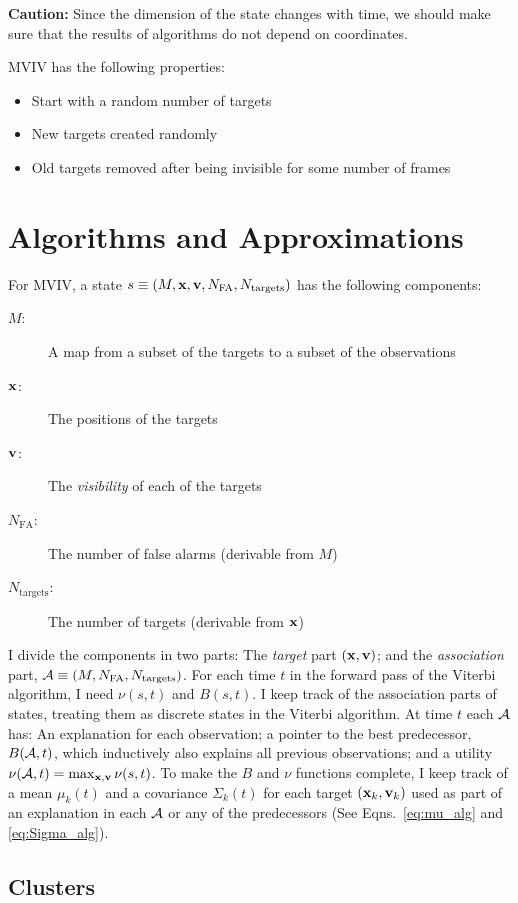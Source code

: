 \documentclass[11pt]{article}
\newcommand{\cA}{{\cal A}}
\begin{document}
\textbf{Caution:} Since the dimension of the state changes with time,
we should make sure that the results of algorithms do not depend on
coordinates.

MVIV has the following properties:
\begin{itemize}
\item Start with a random number of targets
\item New targets created randomly
\item Old targets removed after being invisible for some number of
  frames
\end{itemize}

\section{Algorithms and Approximations}
\label{sec:algorithms}

For MVIV, a state $s \equiv (M, {\mathbf{x}}, {\mathbf{v}}, N_{\text{FA}},
N_{\text{targets}})$ has the following components:
\begin{description}
\item[$M$:] A map from a subset of the targets to a subset of the observations
\item[${\mathbf{x}}$:] The positions of the targets
\item[${\mathbf{v}}$:] The \emph{visibility} of each of the targets
\item[$N_{\text{FA}}$:] The number of false alarms (derivable from $M$)
\item[$N_{\text{targets}}$:] The number of targets (derivable from ${\mathbf{x}}$)
\end{description}
I divide the components in two parts: The \emph{target} part
$({\mathbf{x}},{\mathbf{v}})$; and the \emph{association} part, $\cA \equiv (M,
N_{\text{FA}}, N_{\text{targets}})$.  For each time $t$ in the forward
pass of the Viterbi algorithm, I need $\nu(s,t)$ and $B(s,t)$.  I keep
track of the association parts of states, treating them as discrete
states in the Viterbi algorithm.  At time $t$ each $\cA$ has: An
explanation for each observation; a pointer to the best predecessor,
$B(\cA,t)$, which inductively also explains all previous observations;
and a utility $\nu(\cA,t) = \max_{\bx,\bv} \nu(s,t)$.  To make the $B$
and $\nu$ functions complete, I keep track of a mean $\mu_k(t)$ and a
covariance $\Sigma_k(t)$ for each target $({\mathbf{x}}_k,{\mathbf{v}}_k)$ used as part
of an explanation in each $\cA$ or any of the predecessors (See
Eqns.~\eqref{eq:mu_alg} and \eqref{eq:Sigma_alg}).

\subsection{Clusters}
\label{sec:clusters}
\end{document}
